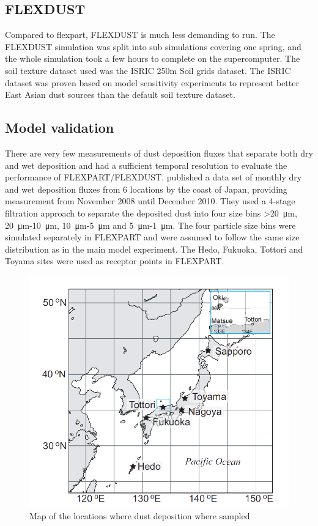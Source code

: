 \subsection{FLEXDUST}
Compared to \acrshort{flexpart}, FLEXDUST is much less demanding to run. The FLEXDUST simulation was split into sub simulations covering one spring, and the whole simulation took a few hours to complete on the supercomputer. 
The soil texture dataset used was the ISRIC 250m Soil grids dataset. The ISRIC dataset was proven based on model sensitivity experiments to represent better East Asian dust sources than the default soil texture dataset.      

\subsection{Model validation}\label{sec:model_eval_discription}
There are very few measurements of dust deposition fluxes that separate both dry and wet deposition and had a sufficient temporal resolution to evaluate the performance of FLEXPART/FLEXDUST. \textcite{osada2014wet} published a data set of monthly dry and wet deposition fluxes from 6 locations by the coast of Japan, providing measurement from November 2008 until December 2010. They used a 4-stage filtration approach to separate the deposited dust into four size bins  >\SI{20}{\micro\metre}, \SI{20}{\micro\metre}-\SI{10}{\micro\metre}, \SI{10}{\micro\metre}-\SI{5}{\micro\metre} and \SI{5}{\micro\metre}-\SI{1}{\micro\metre}. 
The four particle size bins were simulated separately in FLEXPART and were assumed to follow the same size distribution as in the main model experiment. The Hedo, Fukuoka, Tottori and Toyama sites were used as receptor points in FLEXPART. 

\begin{figure}[htpb]
    \centering
    \includegraphics[scale=0.45]{texfiles/figs/Osada_locations.PNG}
    \caption{Map of the locations where dust deposition where sampled \parencite{osada2014wet}}
    \label{fig:map_japan}
\end{figure}



